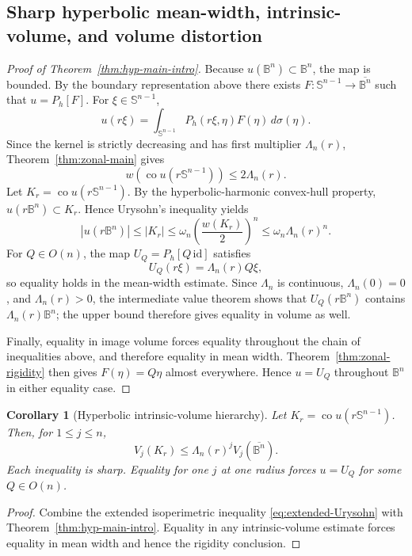 \documentclass[11pt,reqno]{amsart}
\newtheorem{corollary}[theorem]{Corollary}
\theoremstyle{remark}
\begin{document}
\subsection{Sharp hyperbolic mean-width, intrinsic-volume, and volume distortion}
\begin{proof}[Proof of Theorem~\ref{thm:hyp-main-intro}]
Because $u(\mathbb B^n)\subset\mathbb B^n$, the map is bounded.  By the boundary representation above there exists $F:\mathbb S^{n-1}\to\overline{\mathbb B^n}$ such that $u=P_h[F]$.  For $\xi\in\mathbb S^{n-1}$,
\[
 u(r\xi)=\int_{\mathbb S^{n-1}}P_h(r\xi,\eta)F(\eta)\,d\sigma(\eta).
\]
Since the kernel is strictly decreasing and has first multiplier $\Lambda_n(r)$, Theorem~\ref{thm:zonal-main} gives
\[
 w\!\left(\operatorname{co}u(r\mathbb S^{n-1})\right)\le2\Lambda_n(r).
\]
Let $K_r=\operatorname{co}u(r\mathbb S^{n-1})$.  By the hyperbolic-harmonic convex-hull property, $u(r\mathbb B^n)\subset K_r$.  Hence Urysohn's inequality yields
\[
 |u(r\mathbb B^n)|\le |K_r|
 \le\omega_n\left(\frac{w(K_r)}2\right)^n
 \le\omega_n\Lambda_n(r)^n.
\]
For $Q\in O(n)$, the map $U_Q=P_h[Q\,\mathrm{id}]$ satisfies
\[
 U_Q(r\xi)=\Lambda_n(r)Q\xi,
\]
so equality holds in the mean-width estimate.  Since $\Lambda_n$ is continuous, $\Lambda_n(0)=0$, and $\Lambda_n(r)>0$, the intermediate value theorem shows that $U_Q(r\mathbb B^n)$ contains $\Lambda_n(r)\mathbb B^n$; the upper bound therefore gives equality in volume as well.

Finally, equality in image volume forces equality throughout the chain
of inequalities above, and therefore equality in mean width.
Theorem~\ref{thm:zonal-rigidity} then gives $F(\eta)=Q\eta$ almost
everywhere.  Hence $u=U_Q$ throughout $\mathbb B^n$ in either equality case.
\end{proof}

\begin{corollary}[Hyperbolic intrinsic-volume hierarchy]\label{hyp:cor:hyp-intrinsic}
Let $K_r=\operatorname{co}u(r\mathbb S^{n-1})$. Then, for $1\le j\le n$,
\[
 V_j(K_r)\le \Lambda_n(r)^j V_j(\overline{\mathbb B^n}).
\]
Each inequality is sharp.  Equality for one $j$ at one radius forces $u=U_Q$ for some $Q\in O(n)$.
\end{corollary}
\begin{proof}
Combine the extended isoperimetric inequality \eqref{eq:extended-Urysohn} with Theorem~\ref{thm:hyp-main-intro}.  Equality in any intrinsic-volume estimate forces equality in mean width and hence the rigidity conclusion.
\end{proof}
\end{document}
